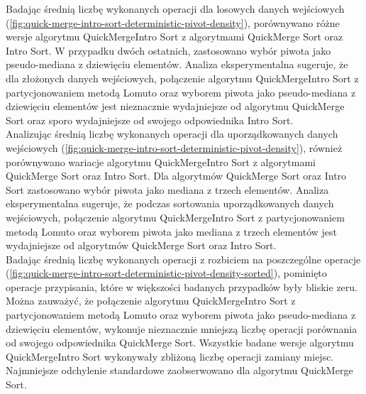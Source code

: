 Badając średnią liczbę wykonanych operacji dla losowych danych wejściowych (\ref{fig:quick-merge-intro-sort-deterministic-pivot-density}), porównywano różne wersje algorytmu QuickMergeIntro Sort z algorytmami QuickMerge Sort oraz Intro Sort. W przypadku dwóch ostatnich, zastosowano wybór piwota jako pseudo-mediana z dziewięciu elementów. Analiza eksperymentalna sugeruje, że dla złożonych danych wejściowych, połączenie algorytmu QuickMergeIntro Sort z partycjonowaniem metodą Lomuto oraz wyborem piwota jako pseudo-mediana z dziewięciu elementów jest nieznacznie wydajniejsze od algorytmu QuickMerge Sort oraz sporo wydajniejsze od swojego odpowiednika Intro Sort.\\ 

Analizując średnią liczbę wykonanych operacji dla uporządkowanych danych wejściowych (\ref{fig:quick-merge-intro-sort-deterministic-pivot-density}), również porównywano wariacje algorytmu QuickMergeIntro Sort z algorytmami QuickMerge Sort oraz Intro Sort. Dla algorytmów QuickMerge Sort oraz Intro Sort zastosowano wybór piwota jako mediana z trzech elementów. Analiza eksperymentalna sugeruje, że podczas sortowania uporządkowanych danych wejściowych, połączenie algorytmu QuickMergeIntro Sort z partycjonowaniem metodą Lomuto oraz wyborem piwota jako mediana z trzech elementów jest wydajniejsze od algorytmów QuickMerge Sort oraz Intro Sort.\\

Badając średnią liczbę wykonanych operacji z rozbiciem na poszczególne operacje (\ref{fig:quick-merge-intro-sort-deterministic-pivot-density-sorted}), pominięto operacje przypisania, które w większości badanych przypadków były bliskie zeru. Można zauważyć, że połączenie algorytmu QuickMergeIntro Sort z partycjonowaniem metodą Lomuto oraz wyborem piwota jako pseudo-mediana z dziewięciu elementów, wykonuje nieznacznie mniejszą liczbę operacji porównania od swojego odpowiednika QuickMerge Sort. Wszystkie badane wersje algorytmu QuickMergeIntro Sort wykonywały zbliżoną liczbę operacji zamiany miejsc. Najmniejsze odchylenie standardowe zaobserwowano dla algorytmu QuickMerge Sort.\\

\begin{figure}[]
	\centering
	
	\caption[]{}
	\label{fig:quick-merge-intro-sort-deterministic-pivot-random-sorted}
\end{figure}

